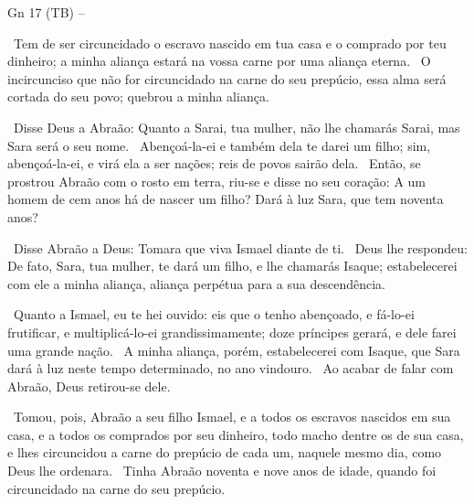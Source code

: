 \documentclass[12pt,aspectratio=169]{beamer}
\newcommand{\ver}[1]{%
    \raisebox{0.50ex}{%
        \scalebox{1.1}{%
            \pmb{\textbf{\textcolor{BSpbg}{#1}}}%
        }%
    }%
}
\newcommand{\QUOTE}[1]{%
    \par\noindent\hspace*{0.05\linewidth}%
    \begin{minipage}{0.9\linewidth}%
        \linespread{1.35}\large{#1}%
    \end{minipage}%
}
\newcommand{\RED}[1]{{\textcolor{TXred}{#1}}}
\newcommand{\YEL}[1]{{\textcolor{TXyel}{#1}}}
\newcommand{\GRE}[1]{{\textcolor{TXgre}{#1}}}
\newcommand{\CYA}[1]{{\textcolor{TXcya}{#1}}}
\newcommand{\MAG}[1]{{\textcolor{TXmag}{#1}}}
\newcommand{\BRI}[1]{{\textcolor{BSpbg}{#1}}}   %
\begin{document}
\begin{frame}[allowframebreaks]{\BRI{Gn 17} (TB) --}
        \pagebreak

        \QUOTE{%
            \ver{13}~Tem de ser circuncidado o escravo nascido em tua casa e o comprado por teu
            dinheiro; a minha aliança estará na vossa carne por uma \YEL{aliança eterna}.
            \ver{14}~O \RED{incircunciso} que não for circuncidado na carne do seu prepúcio,
            \YEL{essa alma} será cortada do seu povo; \RED{quebrou} a minha aliança.
        }

        \pagebreak

        \QUOTE{%
            \ver{15}~Disse Deus a Abraão: Quanto a Sarai, tua mulher, não lhe chamarás Sarai,
            mas \YEL{Sara} será o seu nome.
            \ver{16}~Abençoá-la-ei e também \YEL{dela} te darei um filho; sim, abençoá-la-ei, e
            virá ela a ser nações; \MAG{reis} de povos sairão \YEL{dela}.
            \ver{17}~Então, se prostrou Abraão com o rosto em terra, riu-se e disse no seu
            coração: A um homem de cem anos há de nascer um filho? Dará à luz Sara, que tem
            noventa anos?
        }

        \pagebreak

        \QUOTE{%
            \ver{18}~Disse Abraão a Deus: Tomara que viva Ismael diante de ti.
            \ver{19}~Deus lhe respondeu: \CYA{De fato}, Sara, tua mulher, te dará um filho, e
            lhe chamarás \GRE{Isaque}; \YEL{estabelecerei com ele a minha aliança, aliança
            perpétua para a sua descendência}.
        }

        \pagebreak

        \QUOTE{%
            \ver{20}~Quanto a Ismael, eu te hei ouvido: eis que o tenho abençoado, e fá-lo-ei
            frutificar, e multiplicá-lo-ei grandissimamente; doze príncipes gerará, e dele farei
            uma grande nação.
            \ver{21}~\YEL{A minha aliança, porém, estabelecerei com Isaque}, que Sara dará à luz
            neste tempo determinado, no ano vindouro.
            \ver{22}~Ao acabar de falar com Abraão, Deus retirou-se dele.
        }

        \pagebreak

        \QUOTE{%
            \ver{23}~Tomou, pois, Abraão a seu filho Ismael, e a todos os escravos nascidos em
            sua casa, e a todos os comprados por seu dinheiro, todo macho dentre os de sua casa,
            e lhes circuncidou a carne do prepúcio de cada um, \YEL{naquele mesmo dia},
            \GRE{como Deus lhe ordenara}.
            \ver{24}~Tinha Abraão noventa e nove anos de idade, quando foi circuncidado na carne
            do seu prepúcio.
        }


\end{frame}
\end{document}
